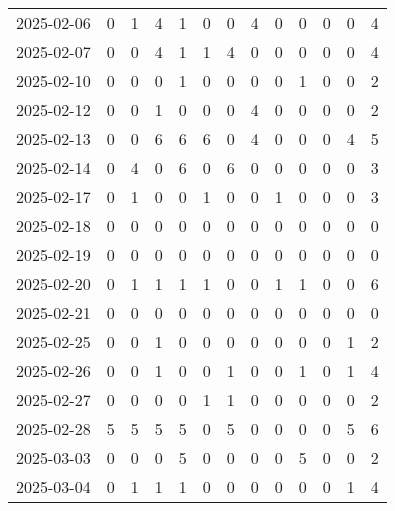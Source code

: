 \documentclass[dvipdfmx,oneside]{article}
\begin{document}
\begin{longtable}{lcccccccccccc}
        2025-02-06 &     0 &     1 &     4 &     1 &     0 &     0 &     4 &     0 &     0 &     0 &     0 &      4 \\
        2025-02-07 &     0 &     0 &     4 &     1 &     1 &     4 &     0 &     0 &     0 &     0 &     0 &      4 \\
        2025-02-10 &     0 &     0 &     0 &     1 &     0 &     0 &     0 &     0 &     1 &     0 &     0 &      2 \\
        2025-02-12 &     0 &     0 &     1 &     0 &     0 &     0 &     4 &     0 &     0 &     0 &     0 &      2 \\
        2025-02-13 &     0 &     0 &     6 &     6 &     6 &     0 &     4 &     0 &     0 &     0 &     4 &      5 \\
        2025-02-14 &     0 &     4 &     0 &     6 &     0 &     6 &     0 &     0 &     0 &     0 &     0 &      3 \\
        2025-02-17 &     0 &     1 &     0 &     0 &     1 &     0 &     0 &     1 &     0 &     0 &     0 &      3 \\
        2025-02-18 &     0 &     0 &     0 &     0 &     0 &     0 &     0 &     0 &     0 &     0 &     0 &      0 \\
        2025-02-19 &     0 &     0 &     0 &     0 &     0 &     0 &     0 &     0 &     0 &     0 &     0 &      0 \\
        2025-02-20 &     0 &     1 &     1 &     1 &     1 &     0 &     0 &     1 &     1 &     0 &     0 &      6 \\
        2025-02-21 &     0 &     0 &     0 &     0 &     0 &     0 &     0 &     0 &     0 &     0 &     0 &      0 \\
        2025-02-25 &     0 &     0 &     1 &     0 &     0 &     0 &     0 &     0 &     0 &     0 &     1 &      2 \\
        2025-02-26 &     0 &     0 &     1 &     0 &     0 &     1 &     0 &     0 &     1 &     0 &     1 &      4 \\
        2025-02-27 &     0 &     0 &     0 &     0 &     1 &     1 &     0 &     0 &     0 &     0 &     0 &      2 \\
        2025-02-28 &     5 &     5 &     5 &     5 &     0 &     5 &     0 &     0 &     0 &     0 &     5 &      6 \\
        2025-03-03 &     0 &     0 &     0 &     5 &     0 &     0 &     0 &     0 &     5 &     0 &     0 &      2 \\
        2025-03-04 &     0 &     1 &     1 &     1 &     0 &     0 &     0 &     0 &     0 &     0 &     1 &      4 \\

\end{longtable}
\end{document}

